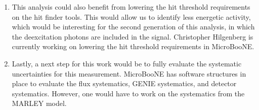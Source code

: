 \begin{enumerate}
\item This analysis could also benefit from lowering the hit threshold requirements on the hit finder tools. This would allow us to identify less energetic activity, which would be interesting for the second generation of this analysis, in which the deexcitation photons are included in the signal. Christopher Hilgenberg is currently working on lowering the hit threshold requirements in MicroBooNE. 
 
\item Lastly, a next step for this work would be to fully evaluate the systematic uncertainties for this measurement. MicroBooNE has software structures in place to evaluate the flux systematics, GENIE systematics, and detector systematics. However, one would have to work on the systematics from the MARLEY model. 
\end{enumerate}
